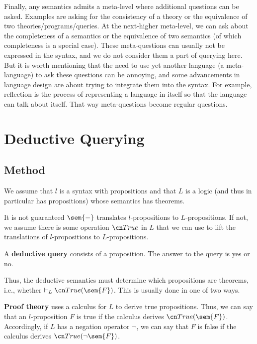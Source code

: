 \begin{remark}
Finally, any semantics admits a meta-level where additional questions can be asked.
Examples are asking for the consistency of a theory or the equivalence of two theories/programs/queries.
At the next-higher meta-level, we can ask about the completeness of a semantics or the equivalence of two semantics (of which completeness is a special case).
These meta-questions can usually not be expressed in the syntax, and we do not consider them a part of querying here.
But it is worth mentioning that the need to use yet another language (a meta-language) to ask these questions can be annoying, and some advancements in language design are about trying to integrate them into the syntax.
For example, reflection is the process of representing a language in itself so that the language can talk about itself.
That way meta-questions become regular questions.
\end{remark}


\section{Deductive Querying}\label{sec:bolquery:ded}

\subsection{Method}

We assume that $l$ is a syntax with propositions and that $L$ is a logic (and thus in particular has propositions) whose semantics has theorems.

It is not guaranteed $\sem{-}$ translates $l$-propositions to $L$-propositions.
If not, we assume there is some operation $\truelift$ in $L$ that we can use to lift the translations of $l$-propositions to $L$-propositions.

A \textbf{deductive query} consists of a proposition.
The answer to the query is yes or no.

Thus, the deductive semantics must determine which propositions are theorems, i.e., whether $\vdash_L\truelift(\sem{F})$.
This is usually done in one of two ways.

\textbf{Proof theory} uses a calculus for $L$ to derive true propositions.
Thus, we can say that an $l$-proposition $F$ is true if the calculus derives $\truelift(\sem{F})$.
Accordingly, if $L$ has a negation operator $\neg$, we can say that $F$ is false if the calculus derives $\truelift(\neg\sem{F})$.

